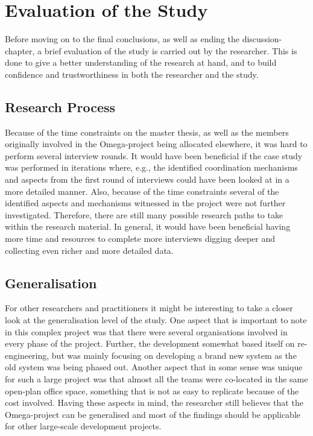 \section{Evaluation of the Study}

Before moving on to the final conclusions, as well as ending the discussion-chapter, a brief evaluation of the study is carried out by the researcher. This is done to give a better understanding of the research at hand, and to build confidence and trustworthiness in both the researcher and the study. 

\subsection{Research Process}

Because of the time constraints on the master thesis, as well as the members originally involved in the Omega-project being allocated elsewhere, it was hard to perform several interview rounds. It would have been beneficial if the case study was performed in iterations where, e.g., the identified coordination mechanisms and aspects from the first round of interviews could have been looked at in a more detailed manner. Also, because of the time constraints several of the identified aspects and mechanisms witnessed in the project were not further investigated. Therefore, there are still many possible research paths to take within the research material. In general, it would have been beneficial having more time and resources to complete more interviews digging deeper and collecting even richer and more detailed data.

\subsection{Generalisation}

For other researchers and practitioners it might be interesting to take a closer look at the generalisation level of the study. One aspect that is important to note in this complex project was that there were several organisations involved in every phase of the project. Further, the development somewhat based itself on re-engineering, but was mainly focusing on developing a brand new system as the old system was being phased out. Another aspect that in some sense was unique for such a large project was that almost all the teams were co-located in the same open-plan office space, something that is not as easy to replicate because of the cost involved. Having these aspects in mind, the researcher still believes that the Omega-project can be generalised and most of the findings should be applicable for other large-scale development projects.

